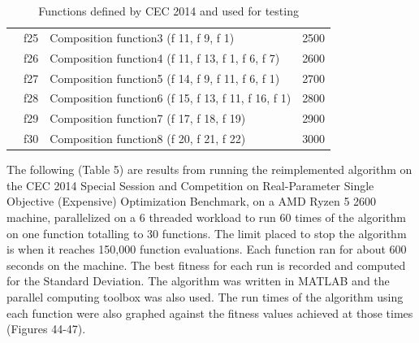 \begin{table}[]
\begin{tabular}{llll}
    & f25 & Composition function3 (f 11, f 9, f 1) & 2500 \\
    & f26 & Composition function4 (f 11, f 13, f 1, f 6, f 7) & 2600 \\
    & f27 & Composition function5 (f 14, f 9, f 11, f 6, f 1) & 2700 \\
    & f28 & Composition function6 (f 15, f 13, f 11, f 16, f 1) & 2800 \\
    & f29 & Composition function7 (f 17, f 18, f 19) & 2900 \\
    & f30 & Composition function8 (f 20, f 21, f 22) & 3000
\end{tabular}
\caption{Functions defined by CEC 2014 and used for testing}
\end{table}

\clearpage

\par The following (Table 5) are results from running the reimplemented algorithm on the CEC 2014 Special Session and Competition on Real-Parameter Single Objective (Expensive) Optimization Benchmark\cite{liang_2013}, on a AMD Ryzen 5 2600 machine, parallelized on a 6 threaded workload to run 60 times of the algorithm on one function totalling to 30 functions. The limit placed to stop the algorithm is when it reaches 150,000 function evaluations. Each function ran for about 600 seconds on the machine. The best fitness for each run is recorded and computed for the Standard Deviation. The algorithm was written in MATLAB and the parallel computing toolbox was also used. The run times of the algorithm using each function were also graphed against the fitness values achieved at those times (Figures 44-47).


